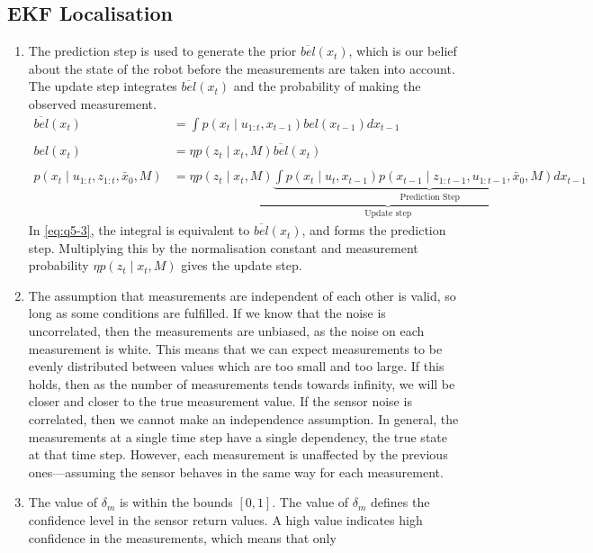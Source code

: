 \documentclass[a4paper,12pt]{article}
\newcommand{\eqname}[1]{\tag*{#1}} %
\begin{document}
\subsection{EKF Localisation}
\begin{enumerate}[resume]
\item The prediction step is used to generate the prior $\overline{bel}(x_t)$,
  which is our belief about the state of the robot before the measurements are
  taken into account. The update step integrates $\overline{bel}(x_t)$ and the
  probability of making the observed measurement.
  \begin{align}
    \overline{bel}(x_t)&=\int{p(x_t \mid
      u_{1:t},x_{t-1})bel(x_{t-1})dx_{t-1}}\\\eqname{Prediction step} \\
    bel(x_t)&=\eta p(z_t \mid x_t,M)\overline{bel}(x_t)\\\eqname{Update step}\\
    p(x_t\mid u_{1:t},z_{1:t},\bar{x}_0,M)&=\underbrace{\eta p(z_t \mid x_t,M)\underbrace{\int{p(x_t \mid
      u_t,x_{t-1})p(x_{t-1} \mid
      z_{1:t-1},u_{1:t-1},\bar{x}_0,M)dx_{t-1}}}_\text{Prediction
    Step}}_\text{Update step}\label{eq:q5-3}
  \end{align}
  In \eqref{eq:q5-3}, the integral is equivalent to $\overline{bel}(x_t)$, and forms
  the prediction step. Multiplying this by the normalisation constant and
  measurement probability $\eta p(z_t \mid x_t,M)$ gives the update step.
\item The assumption that measurements are independent of each other is valid,
  so long as some conditions are fulfilled. If we know that the noise is
  uncorrelated, then the measurements are unbiased, as the noise on each
  measurement is white. This means that we can expect measurements to be evenly
  distributed between values which are too small and too large. If this holds,
  then as the number of measurements tends towards infinity, we will be closer
  and closer to the true measurement value. If the sensor noise is correlated,
  then we cannot make an independence assumption. In general, the measurements
  at a single time step have a single dependency, the true state at that time
  step. However, each measurement is unaffected by the previous ones---assuming
  the sensor behaves in the same way for each measurement.
\item The value of $\delta_m$ is within the bounds $[0,1]$. The value of
  $\delta_m$ defines the confidence level in the sensor return values. A high
  value indicates high confidence in the measurements, which means that only

\end{enumerate}
\end{document}
